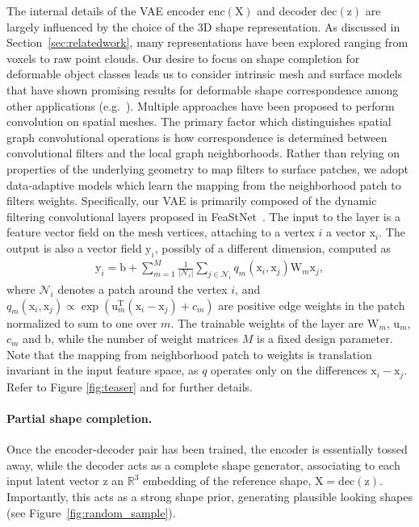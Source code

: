 \documentclass[10pt,twocolumn,letterpaper]{article}
\newcommand{\bb}[1]{\bm{\mathrm{#1}}}
\begin{document}
The internal details of the VAE encoder $\mathrm{enc}(\bb{X})$ and decoder $\mathrm{dec}(\bb{z})$ are largely influenced by the choice of the 3D shape representation. As discussed in Section~\ref{sec:relatedwork}, many representations have been explored ranging from voxels to raw point clouds. Our desire to focus on shape completion for deformable object classes leads us to consider intrinsic mesh and surface models that have shown promising results for deformable shape correspondence among other applications (e.g.~\cite{masci15,monet}). Multiple approaches have been proposed to perform convolution on spatial meshes. The primary factor which distinguishes spatial graph convolutional operations is how correspondence is determined between convolutional filters and the local graph neighborhoods. Rather than relying on properties of the underlying geometry to map filters to surface patches, we adopt data-adaptive models which learn the mapping from the neighborhood patch to filters weights. Specifically, our VAE is primarily composed of the dynamic filtering convolutional layers proposed in FeaStNet~\cite{dynFilt}. The input to the layer is a feature vector field on the mesh vertices, attaching to a vertex $i$ a vector $\bb{x}_i$. The output is also a vector field $\bb{y}_i$, possibly of a different dimension, computed as  
\begin{align}\label{eq:filt}
\bb{y}_i = \bb{b} + \sum_{m=1}^{M} \frac{1}{|\mathcal{N}_i|} \sum_{j\in \mathcal{N}_i} q_m(\bb{x}_i, \bb{x}_j) \bb{W}_m \bb{x}_j,
\end{align}
where $\mathcal{N}_i$ denotes a patch around the vertex $i$, and 
$q_m(\bb{x}_i, \bb{x}_j) \propto \exp (\bb{u}_m^\mathrm{T} (\bb{x}_i - \bb{x}_j) + c_m)$
are positive edge weights in the patch normalized to sum to one over $m$.
The trainable weights of the layer are $\bb{W}_m$, $\bb{u}_m$, $c_m$ and $\bb{b}$, while the number of weight matrices $M$ is a fixed design parameter. Note that the mapping from neighborhood patch to weights is translation invariant in the input feature space, as $q$ operates only on the differences $\bb{x}_i-\bb{x}_j$. Refer to Figure \ref{fig:teaser} and \cite{dynFilt} for further details.

\paragraph{Partial shape completion.}
Once the encoder-decoder pair has been trained, the encoder is essentially tossed away, while the decoder acts as a complete shape generator, associating to each input latent vector $\bb{z}$ an $\mathbb{R}^3$ embedding of the reference shape, $\bb{X} = \mathrm{dec}(\bb{z})$. Importantly, this acts as a strong shape prior, generating plausible looking shapes (see Figure~\ref{fig:random_sample}).
\end{document}
